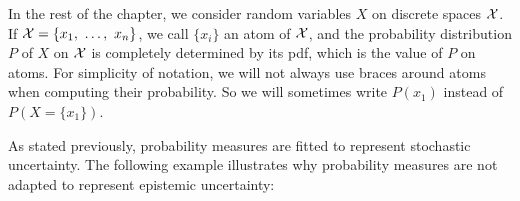 
In the rest of the chapter, we consider random variables $X$ on discrete spaces $\mathcal{X}$. If $\mathcal{X}=\{x_1,~\ldots,~x_n\}$, we call $\{x_i\}$ an atom of $\mathcal{X}$, and the probability distribution $P$ of $X$ on $\mathcal{X}$ is completely determined by its \acrshort{pdf}, which is the value of $P$ on atoms. For simplicity of notation, we will not always use braces around atoms when computing their probability. So we will sometimes write $P(x_1)$ instead of $P(X=\{x_1\})$.

As stated previously, probability measures are fitted to represent stochastic uncertainty. The following example illustrates why probability measures are not adapted to represent epistemic uncertainty:

